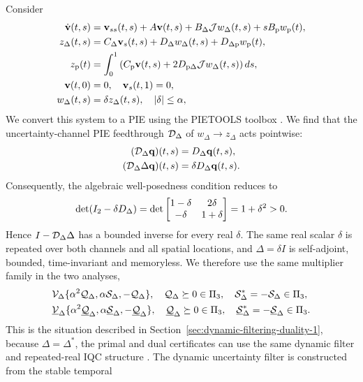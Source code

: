 Consider
\begin{align*}
 \dot{\mathbf{v}}(t,s)&=\mathbf{v}_{ss}(t,s)+A\mathbf{v}(t,s)
      +B_\Delta\mathcal{J}w_\Delta(t,s)+sB_{{\mathrm{p}}}w_{{\mathrm{p}}}(t),\\
 z_\Delta(t,s)&=C_\Delta\mathbf{v}_s(t,s)+D_{\Delta}w_\Delta(t,s)
      +D_{\Delta{\mathrm{p}}}w_{{\mathrm{p}}}(t),\\
 z_{{\mathrm{p}}}(t)&=\int_0^1\left(C_{{\mathrm{p}}}\mathbf{v}(t,s)
      +2D_{{\mathrm{p}}\Delta}\mathcal{J}w_\Delta(t,s)\right)ds,\\
      \mathbf{v}(t,0)&=0,\quad \mathbf{v}_s(t,1)=0,\\
      w_\Delta(t,s)&=\delta z_\Delta(t,s),\quad |\delta|\leq\alpha,\\
\end{align*}
We convert this system to a PIE using the PIETOOLS toolbox
\cite{pietools2025manual}. We find that the uncertainty-channel
PIE feedthrough $\mathcal{D}_\Delta$ of $w_\Delta \to z_\Delta$ acts pointwise:
\begin{align*}
 (\mathcal{D}_\Delta\mathbf{q})(t,s)&=D_\Delta\mathbf{q}(t,s),\\
 (\mathcal{D}_\Delta\Delta\mathbf{q})(t,s)&=\delta D_\Delta\mathbf{q}(t,s).
\end{align*}
Consequently, the algebraic well-posedness condition reduces to
\begin{equation*}
 \det(I_2-\delta D_\Delta)
 =\det\begin{bmatrix}1-\delta&2\delta\\-\delta&1+\delta\end{bmatrix}
 =1+\delta^2>0.
\end{equation*}
Hence $I-\mathcal{D}_\Delta\Delta$ has a bounded inverse for
every real $\delta$.
The same real
scalar $\delta$ is repeated over both channels and all spatial
locations, and $\Delta=\delta I$ is self-adjoint, bounded, time-invariant and memoryless. 
We therefore use the same
multiplier family in the two analyses,
\begin{align*}
 &\mathcal{V}_\Delta\{\alpha^2\mathcal{Q}_\Delta,
 \alpha\mathcal{S}_\Delta,-\mathcal{Q}_\Delta\},\quad
 \mathcal{Q}_\Delta\succeq0\in\Pi_3,\quad \mathcal{S}_\Delta^*=-\mathcal{S}_\Delta\in\Pi_3, \\
&\underline{\mathcal{V}}_\Delta\{\alpha^2\underline{\mathcal{Q}}_\Delta,
 \alpha\underline{\mathcal{S}}_\Delta,-\underline{\mathcal{Q}}_\Delta\},\quad
 \underline{\mathcal{Q}}_\Delta\succeq0\in\Pi_3,\quad \underline{\mathcal{S}}_\Delta^*=-\underline{\mathcal{S}}_\Delta\in\Pi_3.
\end{align*}
This is the situation
described in Section~\ref{sec:dynamic-filtering-duality-1}, because
$\Delta=\Delta^*$, the primal and dual certificates can use the same dynamic
filter and repeated-real IQC structure \cite[Lem.~10]{10156335}. The dynamic uncertainty filter is constructed from the stable temporal

